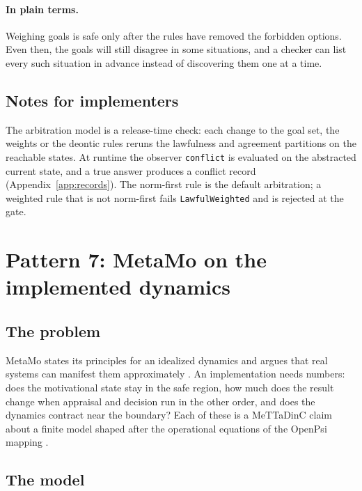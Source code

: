 \documentclass[11pt]{article}
\newcommand{\code}[1]{\texttt{#1}}
\newcommand{\plain}{\paragraph{In plain terms.}}
\theoremstyle{definition}
\theoremstyle{plain}
\begin{document}
\plain Weighing goals is safe only after the rules have removed the forbidden options. Even then,
the goals will still disagree in some situations, and a checker can list every such situation in
advance instead of discovering them one at a time.

\subsection{Notes for implementers}

The arbitration model is a release-time check: each change to the goal set, the weights or the
deontic rules reruns the lawfulness and agreement partitions on the reachable states. At runtime
the observer \code{conflict} is evaluated on the abstracted current state, and a true answer
produces a conflict record (Appendix~\ref{app:records}). The norm-first rule is the default
arbitration; a weighted rule that is not norm-first fails \code{LawfulWeighted} and is rejected at
the gate.

\section{Pattern 7: MetaMo on the implemented dynamics}\label{sec:p7}

\subsection{The problem}

MetaMo states its principles for an idealized dynamics and argues that real systems can manifest
them approximately \cite{metamo1}. An implementation needs numbers: does the motivational state stay in the safe
region, how much does the result change when appraisal and decision run in the other order, and does the dynamics
contract near the boundary? Each of these is a MeTTaDinC claim about a finite model shaped after the
operational equations of the OpenPsi mapping \cite{metamo2}.

\subsection{The model}
\end{document}
